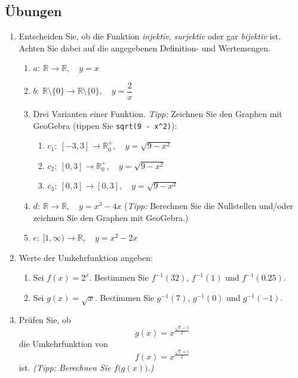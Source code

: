 \subsection{Übungen}
\begin{enumerate}
    \item Entscheiden Sie, ob die Funktion \emph{injektiv}, \emph{surjektiv} oder gar \emph{bijektiv} ist. Achten Sie dabei auf die angegebenen Definition- und Wertemengen.
          \begin{enumerate}
              \item $a:\ \mathbb{R}\to\mathbb{R},\quad y=x$
              \item $b:\ \mathbb{R}\setminus\{0\}\to\mathbb{R}\setminus\{0\},\quad y=\dfrac{2}{x}$
              \item Drei Varianten einer Funktion. \emph{Tipp:} Zeichnen Sie den Graphen mit GeoGebra (tippen Sie \texttt{sqrt(9 - x\string^2)}):
                    \begin{enumerate}
                        \item $c_1:\ [-3,3]\to\mathbb{R}_0^{+},\quad y=\sqrt{9-x^{2}}$
                        \item $c_2:\ [0,3]\to\mathbb{R}_0^{+},\quad y=\sqrt{9-x^{2}}$
                        \item $c_3:\ [0,3]\to[0,3],\quad y=\sqrt{9-x^{2}}$
                    \end{enumerate}
              \item $d:\ \mathbb{R}\to\mathbb{R},\quad y=x^{3}-4x$
                    \quad (\emph{Tipp:} Berechnen Sie die Nullstellen und/oder zeichnen Sie den Graphen mit GeoGebra.)
              \item $e:\ [1,\infty)\to\mathbb{R},\quad y=x^{2}-2x$
          \end{enumerate}

    \item Werte der Umkehrfunktion angeben:
          \begin{enumerate}
              \item Sei $f(x)=2^{x}$. Bestimmen Sie $f^{-1}(32)$, $f^{-1}(1)$ und $f^{-1}(0.25)$.
              \item Sei $g(x)=\sqrt{x}$. Bestimmen Sie $g^{-1}(7)$, $g^{-1}(0)$ und $g^{-1}(-1)$.
          \end{enumerate}

    \item Prüfen Sie, ob
          \[
              g(x)=x^{\frac{\sqrt{5}-1}{2}}
          \]
          die Umkehrfunktion von
          \[
              f(x)=x^{\frac{\sqrt{5}+1}{2}}
          \]
          ist. \emph{(Tipp: Berechnen Sie $f\!\bigl(g(x)\bigr)$.)}
\end{enumerate}
\newpage
